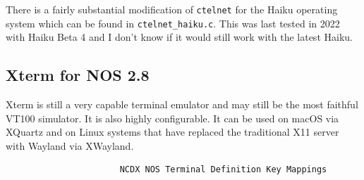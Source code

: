 \documentclass[a4paper,twoside,11pt]{article}
\newcommand{\newpara}{\par\vspace{4mm}\noindent}
\begin{document}
\newpara
There is a fairly substantial modification of \texttt{ctelnet} for the Haiku operating system which can be found in \texttt{ctelnet\_haiku.c}.
This was last tested in 2022 with Haiku Beta 4 and I don't know if it would still work with the latest Haiku. 

\subsection{Xterm for NOS 2.8}
Xterm is still a very capable terminal emulator and may still be the most faithful VT100 simulator. It is also highly configurable. It can be used on macOS
via XQuartz and on Linux systems that have replaced the traditional X11 server with Wayland via XWayland.

\begin{figure}
	\centering
    \begin{verbatim}
                 NCDX NOS Terminal Definition Key Mappings                   
                                                                              

\end{verbatim}
\end{figure}
\end{document}

